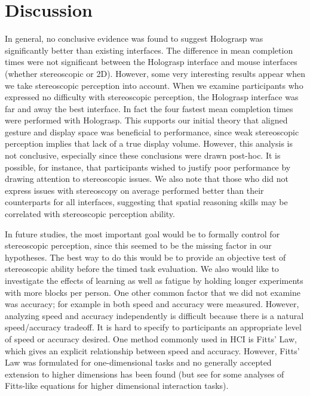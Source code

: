 \documentclass[pageno]{jpaper}
\begin{document}
\section{Discussion}
In general, no conclusive evidence was found to suggest Holograsp was significantly better than existing interfaces. The difference in mean
completion times were not significant between the Holograsp interface and mouse interfaces (whether stereoscopic or 2D). However, some very
interesting results appear when we take stereoscopic perception into account. When we examine participants who expressed no difficulty with
stereoscopic perception, the Holograsp interface was far and away the best interface. In fact the four fastest mean completion times were
performed with Holograsp. This supports our initial theory that aligned gesture and display space was beneficial to performance, since weak
stereoscopic perception implies that lack of a true display volume. However, this analysis is not conclusive, especially since these conclusions
were drawn post-hoc. It is possible, for instance, that participants wished to justify poor performance by drawing attention to stereoscopic issues.
We also note that those who did not express issues with stereoscopy on average performed better than their counterparts for all interfaces, suggesting
that spatial reasoning skills may be correlated with stereoscopic perception ability.

In future studies, the most important goal would be to formally
control for stereoscopic perception, since this seemed to be the missing factor in our hypotheses. The best way to do this
would be to provide an objective test of stereoscopic ability before the timed task evaluation. We also
would like to investigate the effects of learning as well as fatigue by holding longer experiments with
more blocks per person. One other common factor that we did not examine was accuracy; for example in \cite{study1}
both speed and accuracy were measured. However, analyzing speed and accuracy independently is difficult because
there is a natural speed/accuracy tradeoff. It is hard to specify to participants an appropriate level of speed
or accuracy desired. One method commonly used in HCI is Fitts' Law, which gives an explicit relationship between
speed and accuracy. However, Fitts' Law was formulated for one-dimensional tasks and no generally accepted extension
to higher dimensions has been found (but see \cite{mackenzie1992extending, monk1985fitts, murata2001extending} for some analyses of Fitts-like equations for higher
dimensional interaction tasks). 
\end{document}
